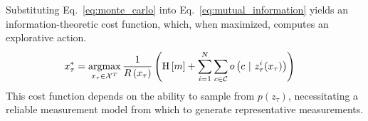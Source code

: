 %
Substituting Eq.~\eqref{eq:monte_carlo} into Eq.~\eqref{eq:mutual_information} yields an information-theoretic cost function, which, when maximized, computes an explorative action.
%
\begin{align}
  \begin{split}
    x_{\tau}^{*}
    &=
    \argmax_{x_{\tau} \in \mc{X}^{T}}
    \frac{1}{R\left(x_{\tau}\right)}
    \left(
      \text{H}
      \left[
        m
      \right]
      +
      \sum_{i=1}^{N}
      \sum_{c \in \mc{C}}
      o
      \left(
      c
      \ \vert
      \ z_{\tau}^{i}(x_{\tau})
      \right)
      \right)
      \label{eq:cost_function}
  \end{split}
\end{align}
%
This cost function depends on the ability to sample from $p(z_{\tau})$, necessitating a reliable measurement model from which to generate representative measurements.
